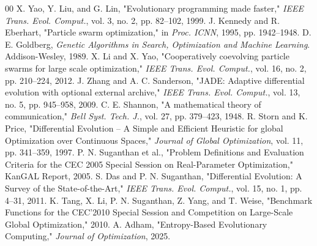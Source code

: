 \documentclass[conference]{IEEEtran}
\begin{document}
\begin{thebibliography}{00}
 X. Yao, Y. Liu, and G. Lin, "Evolutionary programming made faster," \textit{IEEE Trans. Evol. Comput.}, vol. 3, no. 2, pp. 82–102, 1999.
 J. Kennedy and R. Eberhart, "Particle swarm optimization," in \textit{Proc. ICNN}, 1995, pp. 1942–1948.
 D. E. Goldberg, \textit{Genetic Algorithms in Search, Optimization and Machine Learning}. Addison-Wesley, 1989.
 X. Li and X. Yao, "Cooperatively coevolving particle swarms for large scale optimization," \textit{IEEE Trans. Evol. Comput.}, vol. 16, no. 2, pp. 210–224, 2012.
 J. Zhang and A. C. Sanderson, "JADE: Adaptive differential evolution with optional external archive," \textit{IEEE Trans. Evol. Comput.}, vol. 13, no. 5, pp. 945–958, 2009.
 C. E. Shannon, "A mathematical theory of communication," \textit{Bell Syst. Tech. J.}, vol. 27, pp. 379–423, 1948.
 R. Storn and K. Price, "Differential Evolution – A Simple and Efficient Heuristic for global Optimization over Continuous Spaces," \textit{Journal of Global Optimization}, vol. 11, pp. 341–359, 1997.
 P. N. Suganthan et al., "Problem Definitions and Evaluation Criteria for the CEC 2005 Special Session on Real-Parameter Optimization," KanGAL Report, 2005.
 S. Das and P. N. Suganthan, "Differential Evolution: A Survey of the State-of-the-Art," \textit{IEEE Trans. Evol. Comput.}, vol. 15, no. 1, pp. 4–31, 2011.
 K. Tang, X. Li, P. N. Suganthan, Z. Yang, and T. Weise, "Benchmark Functions for the CEC'2010 Special Session and Competition on Large-Scale Global Optimization," 2010.
 A. Adham, "Entropy-Based Evolutionary Computing," \textit{Journal of Optimization}, 2025.
\end{thebibliography}
\end{document}
